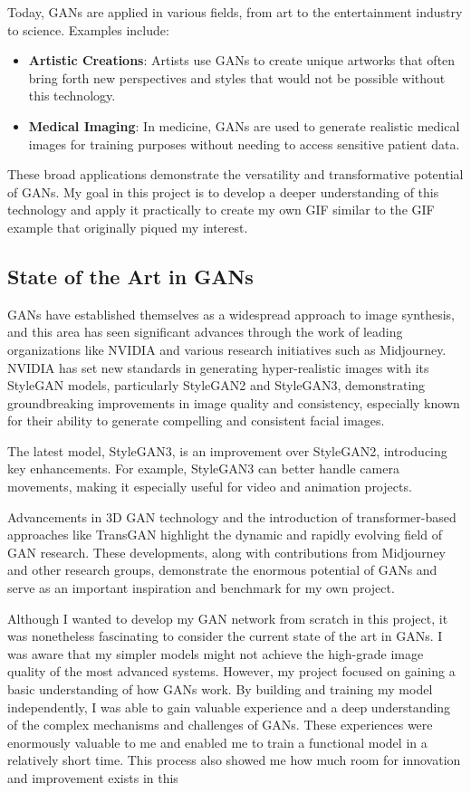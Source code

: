 \documentclass[a4paper, 12pt]{article}
\begin{document}
Today, GANs are applied in various fields, from art to the entertainment industry to science. Examples include:
\begin{itemize}
  \item \textbf{Artistic Creations}: Artists use GANs to create unique artworks that often bring forth new perspectives and styles that would not be possible without this technology.\cite{kunstloft_article}
  \item \textbf{Medical Imaging}: In medicine, GANs are used to generate realistic medical images for training purposes without needing to access sensitive patient data.\cite{avinci_ai_gans}
\end{itemize}

These broad applications demonstrate the versatility and transformative potential of GANs. My goal in this project is to develop a deeper understanding of this technology and apply it practically to create my own GIF similar to the GIF example that originally piqued my interest.

\subsection{State of the Art in GANs}
GANs have established themselves as a widespread approach to image synthesis, and this area has seen significant advances through the work of leading organizations like NVIDIA and various research initiatives such as Midjourney. NVIDIA has set new standards in generating hyper-realistic images with its StyleGAN models, particularly StyleGAN2 and StyleGAN3, demonstrating groundbreaking improvements in image quality and consistency, especially known for their ability to generate compelling and consistent facial images.\cite{StyleGAN3, StyleGAN3_Github, StyleGAN2}

The latest model, StyleGAN3, is an improvement over StyleGAN2, introducing key enhancements. For example, StyleGAN3 can better handle camera movements, making it especially useful for video and animation projects.\cite{StyleGAN3_next}

Advancements in 3D GAN technology and the introduction of transformer-based approaches like TransGAN highlight the dynamic and rapidly evolving field of GAN research.\cite{jiang2021transgan} These developments, along with contributions from Midjourney and other research groups, demonstrate the enormous potential of GANs and serve as an important inspiration and benchmark for my own project.

Although I wanted to develop my GAN network from scratch in this project, it was nonetheless fascinating to consider the current state of the art in GANs. I was aware that my simpler models might not achieve the high-grade image quality of the most advanced systems. However, my project focused on gaining a basic understanding of how GANs work. By building and training my model independently, I was able to gain valuable experience and a deep understanding of the complex mechanisms and challenges of GANs. These experiences were enormously valuable to me and enabled me to train a functional model in a relatively short time. This process also showed me how much room for innovation and improvement exists in this
\end{document}
